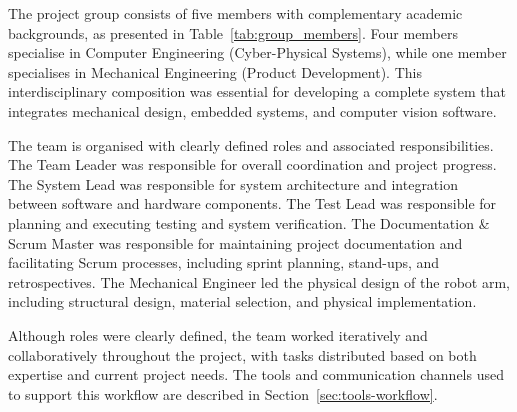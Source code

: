 \label{sec:team}

The project group consists of five members with complementary academic backgrounds,
as presented in Table~\ref{tab:group_members}. Four members specialise in Computer
Engineering (Cyber-Physical Systems), while one member specialises in Mechanical
Engineering (Product Development). This interdisciplinary composition was essential
for developing a complete system that integrates mechanical design, embedded systems,
and computer vision software.

The team is organised with clearly defined roles and associated responsibilities.
The Team Leader was responsible for overall coordination and project progress.
The System Lead was responsible for system architecture and integration between
software and hardware components. The Test Lead was responsible for planning and
executing testing and system verification. The Documentation \& Scrum Master was
responsible for maintaining project documentation and facilitating Scrum processes,
including sprint planning, stand-ups, and retrospectives. The Mechanical Engineer
led the physical design of the robot arm, including structural design, material
selection, and physical implementation.

Although roles were clearly defined, the team worked iteratively and collaboratively
throughout the project, with tasks distributed based on both expertise and current
project needs. The tools and communication channels used to support this workflow
are described in Section~\ref{sec:tools-workflow}.

